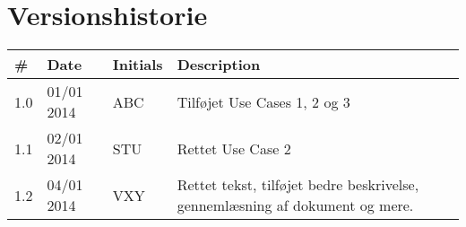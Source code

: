 \documentclass[Main]{subfiles}
\begin{document}
\section*{Versionshistorie}

\begin{tabular}{p{} p{} p{} p{}}
\hline

\textbf{\#} & \textbf{Date} & \textbf{Initials} & \textbf{Description} \\ \hline

\rowcolor{gr}1.0 & 01/01 2014 & ABC & Tilføjet Use Cases 1, 2 og 3 \\ 

1.1 & 02/01 2014 & STU & Rettet Use Case 2 \\

\rowcolor{gr} 1.2 & 04/01 2014 & VXY & Rettet tekst, tilføjet bedre beskrivelse, gennemlæsning af dokument og mere.\\ \hline

\end{tabular} 
\end{document}
